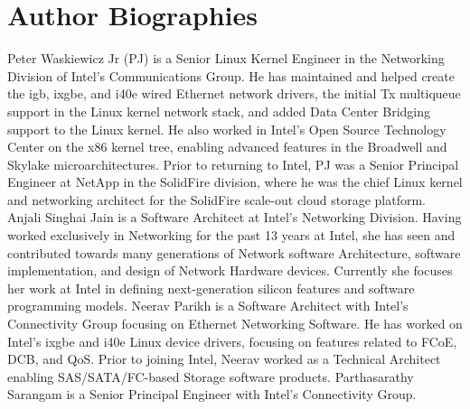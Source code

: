 \documentclass[letterpaper]{article}
\begin{document}
\section{Author Biographies}
Peter Waskiewicz Jr (PJ) is a Senior Linux Kernel Engineer in the Networking Division of Intel's Communications Group. He has maintained and helped create the igb, ixgbe, and i40e wired Ethernet network drivers, the initial Tx multiqueue support in the Linux kernel network stack, and added Data Center Bridging support to the Linux kernel. He also worked in Intel's Open Source Technology Center on the x86 kernel tree, enabling advanced features in the Broadwell and Skylake microarchitectures. Prior to returning to Intel, PJ was a Senior Principal Engineer at NetApp in the SolidFire division, where he was the chief Linux kernel and networking architect for the SolidFire scale-out cloud storage platform.
\newline
\newline
Anjali Singhai Jain is a Software Architect at Intel's Networking Division. Having worked exclusively in Networking for the past 13 years at Intel, she has seen and contributed towards many generations of Network software Architecture, software implementation, and design of Network Hardware devices. Currently she focuses her work at Intel in defining next-generation silicon features and software programming models.
\newline
\newline
Neerav Parikh is a Software Architect with Intel's Connectivity Group focusing on Ethernet Networking Software. He has worked on Intel's ixgbe and i40e Linux device drivers, focusing on features related to FCoE, DCB, and QoS. Prior to joining Intel, Neerav worked as a Technical Architect enabling SAS/SATA/FC-based Storage software products.
\newline
\newline
Parthasarathy Sarangam is a Senior Principal Engineer with Intel's Connectivity Group.
\end{document}
